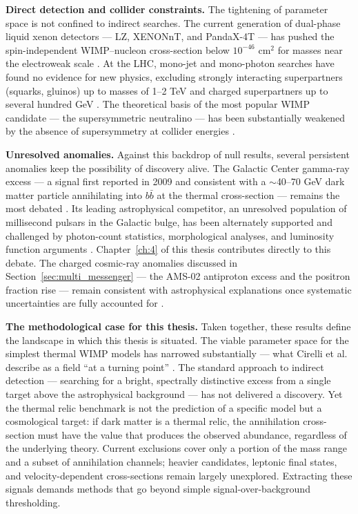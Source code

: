 \textbf{Direct detection and collider constraints.}
The tightening of parameter space is not confined to indirect searches.
The current generation of dual-phase liquid xenon detectors --- LZ, XENONnT, and PandaX-4T --- has pushed the spin-independent WIMP--nucleon cross-section below $10^{-46}$ cm$^2$ for masses near the electroweak scale \cite{Cirelli:2024ssz,Hooper:2024}.
At the LHC, mono-jet and mono-photon searches have found no evidence for new physics, excluding strongly interacting superpartners (squarks, gluinos) up to masses of 1--2 TeV and charged superpartners up to several hundred GeV \cite{Cirelli:2024ssz,Hooper:2024}.
The theoretical basis of the most popular WIMP candidate --- the supersymmetric neutralino --- has been substantially weakened by the absence of supersymmetry at collider energies \cite{Cirelli:2024ssz}.

\textbf{Unresolved anomalies.}
Against this backdrop of null results, several persistent anomalies keep the possibility of discovery alive.
The Galactic Center gamma-ray excess --- a signal first reported in 2009 and consistent with a $\sim$40--70 GeV dark matter particle annihilating into $b\bar{b}$ at the thermal cross-section --- remains the most debated \cite{Daylan:2014rsa,Cirelli:2024ssz,Hooper:2024}.
Its leading astrophysical competitor, an unresolved population of millisecond pulsars in the Galactic bulge, has been alternately supported and challenged by photon-count statistics, morphological analyses, and luminosity function arguments \cite{Cirelli:2024ssz}.
Chapter~\ref{ch:4} of this thesis contributes directly to this debate.
The charged cosmic-ray anomalies discussed in Section~\ref{sec:multi_messenger} --- the AMS-02 antiproton excess and the positron fraction rise --- remain consistent with astrophysical explanations once systematic uncertainties are fully accounted for \cite{Cirelli:2024ssz,Hooper:2024}.

\textbf{The methodological case for this thesis.}
Taken together, these results define the landscape in which this thesis is situated.
The viable parameter space for the simplest thermal WIMP models has narrowed substantially --- what Cirelli et al.
describe as a field ``at a turning point'' \cite{Cirelli:2024ssz}.
The standard approach to indirect detection --- searching for a bright, spectrally distinctive excess from a single target above the astrophysical background --- has not delivered a discovery.
Yet the thermal relic benchmark is not the prediction of a specific model but a cosmological target: if dark matter is a thermal relic, the annihilation cross-section must have the value that produces the observed abundance, regardless of the underlying theory.
Current exclusions cover only a portion of the mass range and a subset of annihilation channels; heavier candidates, leptonic final states, and velocity-dependent cross-sections remain largely unexplored.
Extracting these signals demands methods that go beyond simple signal-over-background thresholding.

